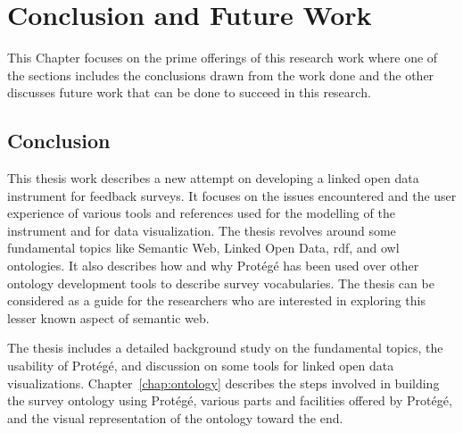 
\chapter{Conclusion and Future Work}
\label{chap:conclusion}
\begin{doublespace}
This Chapter focuses on the prime offerings of this research work where one of the sections includes the conclusions drawn from the work done and the other discusses future work that can be done to succeed in this research.
\section{Conclusion}
\par This thesis work describes a new attempt on developing a linked open data instrument for feedback surveys. It focuses on the issues encountered and the user experience of various tools and references used for the modelling of the instrument and for data visualization. The thesis revolves around some fundamental topics like Semantic Web, Linked Open Data, \ac{rdf}, and \ac{owl} ontologies. It also describes how and why Protégé has been used over other ontology development tools to describe survey vocabularies. The thesis can be considered as a guide for the researchers who are interested in exploring this lesser known aspect of semantic web.
\par The thesis includes a detailed background study on the fundamental topics, the usability of Protégé, and discussion on some tools for linked open data visualizations. Chapter~\ref{chap:ontology} describes the steps involved in building the survey ontology using Protégé, various parts and facilities offered by Protégé, and the visual representation of the ontology toward the end.

\end{doublespace}
